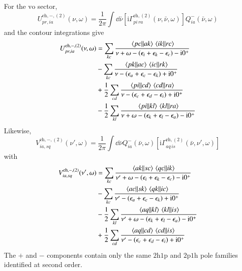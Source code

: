 \documentclass[aip,jcp,reprint,noshowkeys,superscriptaddress]{revtex4-1}
\newcommand{\eps}{\epsilon}
\newcommand{\ii}{\mathrm{i}}
\newcommand{\hhp}{\text{2h1p}}
\newcommand{\pph}{\text{2p1h}}
\newcommand{\eh}{\text{eh}}
\begin{document}
For the $\text{vo}$ sector,
\begin{equation}
    U^{\eh,-,(2)}_{pr,ia}(\nu,\omega)
    =
    \frac{1}{2\pi}
    \int\dd{\bar\nu}
    \left[
    \ii\Gamma^{\eh,(2)}_{pi\,ra}(\nu,\bar\nu,\omega)
    \right]
    Q^-_{ia}(\bar\nu,\omega)
    \label{eq:U_eh_second_minus_def}
\end{equation}
and the contour integrations give
\begin{equation}
    \begin{split}
    U^{\eh,-,(2)}_{pr,ia}(\nu,\omega)
    & =
    \sum_{kc}
    \frac{\mel{pc}{}{ak}\mel{ik}{}{rc}}
    {\nu+\omega-(\eps_i+\eps_k-\eps_c)-\ii0^+}
    \\
    &-
    \sum_{kc}
    \frac{\mel{pk}{}{ac}\mel{ic}{}{rk}}
    {\nu-(\eps_a+\eps_c-\eps_k)+\ii0^+}
    \\
    &+
    \frac12
    \sum_{cd}
    \frac{\mel{pi}{}{cd}\mel{cd}{}{ra}}
    {\nu-(\eps_c+\eps_d-\eps_i)+\ii0^+}
    \\
    &-
    \frac12
    \sum_{kl}
    \frac{\mel{pi}{}{kl}\mel{kl}{}{ra}}
    {\nu+\omega-(\eps_k+\eps_l-\eps_a)-\ii0^+}
    \end{split}
    \label{eq:U_eh_second_minus_explicit}
\end{equation}
Likewise,
\begin{equation}
    V^{\eh,-,(2)}_{ia,sq}(\nu',\omega)
    =
    \frac{1}{2\pi}
    \int\dd{\bar\nu}
    Q^-_{ia}(\bar\nu,\omega)
    \left[
    \ii\Gamma^{\eh,(2)}_{aq\,is}(\bar\nu,\nu',\omega)
    \right]
    \label{eq:V_eh_second_minus_def}
\end{equation}
with
\begin{equation}
    \begin{split}
    V^{\eh,-,(2)}_{ia,sq}(\nu',\omega)
    & =
    \sum_{kc}
    \frac{\mel{ak}{}{sc}\mel{qc}{}{ik}}
    {\nu'+\omega-(\eps_i+\eps_k-\eps_c)-\ii0^+}
    \\
    &-
    \sum_{kc}
    \frac{\mel{ac}{}{sk}\mel{qk}{}{ic}}
    {\nu'-(\eps_a+\eps_c-\eps_k)+\ii0^+}
    \\
    &-
    \frac12
    \sum_{kl}
    \frac{\mel{aq}{}{kl}\mel{kl}{}{is}}
    {\nu'+\omega-(\eps_k+\eps_l-\eps_a)-\ii0^+}
    \\
    &+
    \frac12
    \sum_{cd}
    \frac{\mel{aq}{}{cd}\mel{cd}{}{is}}
    {\nu'-(\eps_c+\eps_d-\eps_i)+\ii0^+}
    \end{split}
    \label{eq:V_eh_second_minus_explicit}
\end{equation}
The $+$ and $-$ components contain only the same $\hhp$ and $\pph$ pole
families identified at second order.
\end{document}
